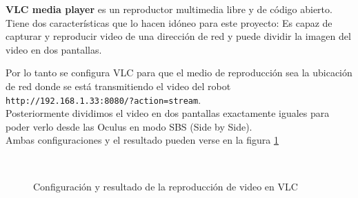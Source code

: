 \documentclass[twoside, 11pt]{epstfg}
\begin{document}
\textbf{VLC media player} es un reproductor multimedia libre y de código abierto. Tiene dos características que lo hacen idóneo para este proyecto: Es capaz de capturar y reproducir video de una dirección de red y puede dividir la imagen del video en dos pantallas.

Por lo tanto se configura VLC para que el medio de reproducción sea la ubicación de red donde se está transmitiendo el video del robot \texttt{http://192.168.1.33:8080/?action=stream}.\\
Posteriormente dividimos el video en dos pantallas exactamente iguales para poder verlo desde las Oculus en modo SBS (Side by Side).\\Ambas configuraciones y el resultado pueden verse en la figura \ref{figstream}

\begin{figure}[H]
	\centering
	\\
		\caption{Configuración y resultado de la reproducción de video en VLC} 
		\label{figstream}
\end{figure}
\end{document}
